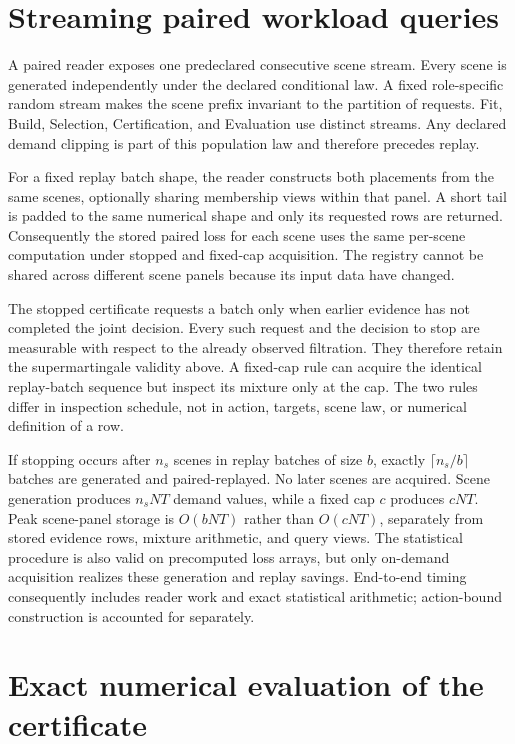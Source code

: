 \documentclass[11pt]{article}
\begin{document}
\section{Streaming paired workload queries}
A paired reader exposes one predeclared consecutive scene stream. Every scene is generated independently under the declared conditional law. A fixed role-specific random stream makes the scene prefix invariant to the partition of requests. Fit, Build, Selection, Certification, and Evaluation use distinct streams. Any declared demand clipping is part of this population law and therefore precedes replay.

For a fixed replay batch shape, the reader constructs both placements from the same scenes, optionally sharing membership views within that panel. A short tail is padded to the same numerical shape and only its requested rows are returned. Consequently the stored paired loss for each scene uses the same per-scene computation under stopped and fixed-cap acquisition. The registry cannot be shared across different scene panels because its input data have changed.

The stopped certificate requests a batch only when earlier evidence has not completed the joint decision. Every such request and the decision to stop are measurable with respect to the already observed filtration. They therefore retain the supermartingale validity above. A fixed-cap rule can acquire the identical replay-batch sequence but inspect its mixture only at the cap. The two rules differ in inspection schedule, not in action, targets, scene law, or numerical definition of a row.

If stopping occurs after $n_s$ scenes in replay batches of size $b$, exactly $\lceil n_s/b\rceil$ batches are generated and paired-replayed. No later scenes are acquired. Scene generation produces $n_sNT$ demand values, while a fixed cap $c$ produces $cNT$. Peak scene-panel storage is $O(bNT)$ rather than $O(cNT)$, separately from stored evidence rows, mixture arithmetic, and query views. The statistical procedure is also valid on precomputed loss arrays, but only on-demand acquisition realizes these generation and replay savings. End-to-end timing consequently includes reader work and exact statistical arithmetic; action-bound construction is accounted for separately.

\section{Exact numerical evaluation of the certificate}
\end{document}
